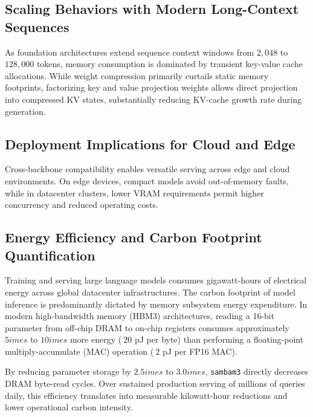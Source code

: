 \subsection{Scaling Behaviors with Modern Long-Context Sequences}
As foundation architectures extend sequence context windows from $2{,}048$ to $128{,}000$ tokens, memory consumption is dominated by transient key-value cache allocations. While weight compression primarily curtails static memory footprints, factorizing key and value projection weights allows direct projection into compressed KV states, substantially reducing KV-cache growth rate during generation.

\subsection{Deployment Implications for Cloud and Edge}
Cross-backbone compatibility enables versatile serving across edge and cloud environments. On edge devices, compact models avoid out-of-memory faults, while in datacenter clusters, lower VRAM requirements permit higher concurrency and reduced operating costs.

\subsection{Energy Efficiency and Carbon Footprint Quantification}
Training and serving large language models consumes gigawatt-hours of electrical energy across global datacenter infrastructures. The carbon footprint of model inference is predominantly dictated by memory subsystem energy expenditure. In modern high-bandwidth memory (HBM3) architectures, reading a 16-bit parameter from off-chip DRAM to on-chip registers consumes approximately $5	imes$ to $10	imes$ more energy ($~20$ pJ per byte) than performing a floating-point multiply-accumulate (MAC) operation ($~2$ pJ per FP16 MAC).

By reducing parameter storage by $2.5	imes$ to $3.0	imes$, \texttt{sambam3} directly decreases DRAM byte-read cycles. Over sustained production serving of millions of queries daily, this efficiency translates into measurable kilowatt-hour reductions and lower operational carbon intensity.
